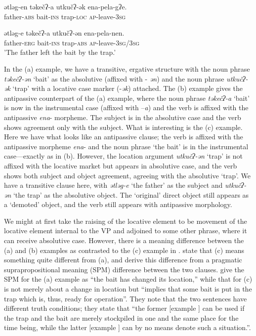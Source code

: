 \documentclass[output=paper,modfonts,nonflat,newtxmath]{langsci/langscibook}
\begin{document}
    \ex \label{ex:basilico:11b}
    \gll ətləg-en   təkečʔ-a   utkučʔ-ək   ena-pela-gʔe.\\
    father-\textsc{\textsc{abs}}  bait-\textsc{ins}  trap-\textsc{loc}  \textsc{ap}{}-leave-3\textsc{sg}\\
    \glt 
    
    \ex \label{ex:basilico:11b}
    \gll ətləg-e  təkečʔ-a  utkučʔ-ən  ena-pela-nen.\\
    father-\textsc{\textsc{erg}}  bait-\textsc{ins}  trap-\textsc{\textsc{abs}}  \textsc{ap}{}-leave-3\textsc{sg}/3\textsc{sg}\\
    \glt 'The father left the bait by the trap.'
    \z
    \z


In the (a) example, we have a transitive, ergative structure with the noun phrase \textit{təkečʔ-ən} ‘bait’ as the absolutive (affixed with - \textit{ən}) and the noun phrase \textit{utkučʔ-ək} ‘trap’ with a locative case marker (-\textit{ək}) attached. The (b) example gives the antipassive counterpart of the (a) example, where the noun phrase \textit{təkečʔ-a} ‘bait’ is now in the instrumental case (affixed with –\textit{a}) and the verb is affixed with the antipassive \textit{ena}{}- morpheme. The subject is in the absolutive case and the verb shows agreement only with the subject. What is interesting is the (c) example. Here we have what looks like an antipassive clause; the verb is affixed with the antipassive morpheme \textit{ena}{}- and the noun phrase ‘the bait’ is in the instrumental case—exactly as in (b). However, the location argument \textit{utkučʔ-ən} ‘trap’ is not affixed with the locative market but appears in absolutive case, and the verb shows both subject and object agreement, agreeing with the absolutive ‘trap’. We have a transitive clause here, with \textit{ətləg-e} ‘the father’ as the subject and \textit{utkučʔ-ən} ‘the trap’ as the absolutive object. The ‘original’ direct object still appears as a ‘demoted’ object, and the verb still appears with antipassive morphology. 

We might at first take the raising of the locative element to be movement of the locative element internal to the VP and adjoined to some other phrase, where it can receive absolutive case. However, there is a meaning difference between the (a) and (b) examples as contrasted to the (c) example in . \citet{KozinskyEtAl1988} state that (c) means something quite different from (a), and derive this difference from a pragmatic suprapropositional meaning (SPM) difference between the two clauses. \citet[684]{KozinskyEtAl1988} give the SPM for the (a) example as “the bait has changed its location,” while that for (c) is not merely about a change in location but “implies that some bait is put in the trap which is, thus, ready for operation”. They note that the two sentences have different truth conditions; they state that “the former [example ] can be used if the trap and the bait are merely stockpiled in one and the same place for the time being, while the latter [example ] can by no means denote such a situation.”. 
\end{document}
